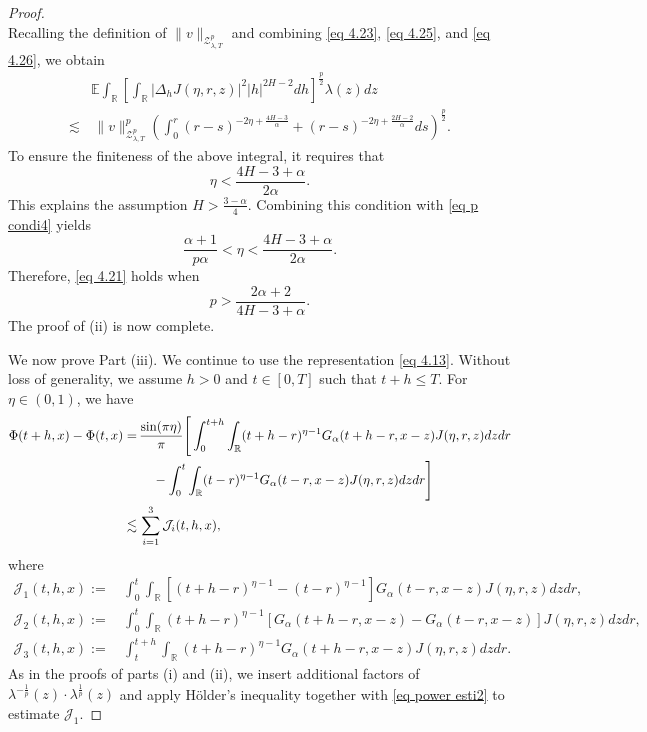 \documentclass[11pt,reqno]{amsart}
\numberwithin{equation}{section}
\newcommand{\1}{{\bf 1}}
\newcommand{\2}{{\bf 2}}
\begin{document}
\begin{proof}
\begin{equation}
\end{equation}
Recalling the definition of $\|v\|_{\mathcal{Z}_{\lambda,T}^p}$ and combining \eqref{eq 4.23}, \eqref{eq 4.25}, and \eqref{eq 4.26}, we obtain
\begin{equation}\label{eq 4.27}
\begin{split}
&\mathbb{E}\int_{\mathbb{R}} \left[\int_{\mathbb{R}}|\Delta_{h}J(\eta,r,z)|^2|h|^{2H-2}dh\right]^{\frac{p}2}\lambda(z)dz \\
 \lesssim &\,  \|v\|_{\mathcal{Z}_{\lambda,T}^p}^p\left( \int_0^r (r-s)^{-2\eta+\frac{4H-3}{\alpha}} +(r-s)^{-2\eta+\frac{2H-2}{\alpha}}ds\right)^{\frac{p}{2}}.
\end{split}
\end{equation}
To ensure the finiteness of the above integral,  it requires that 
 $$
 \eta<\frac{4H-3+\alpha}{2\alpha}.
 $$
  This explains   the assumption  $H> \frac{3-\alpha}{4}$. Combining this condition with \eqref{eq p condi4} yields
   $$
   \frac{\alpha+1}{p\alpha}<\eta<\frac{4H-3+\alpha}{2\alpha}.
   $$ 
  Therefore,   \eqref{eq 4.21} holds when 
  $$
  p>\frac{2\alpha+2}{4H-3+\alpha}.
  $$ 
  The proof of (ii) is now complete.

 
 We now  prove Part (iii). We continue to use the representation \eqref{eq 4.13}. Without loss of generality, we   assume $h>0$ and
$ t \in [0, T ]$ such that $t + h \le T $. For $\eta\in(0,1)$, we have
\begin{align*}
\Phi (t+h,x)-\Phi(t,x) 
 =&\, \frac{\sin(\pi \eta)}{\pi}\Bigg[\int_0^{t+h}\int_{\mathbb{R}}(t+h-r)^{\eta-1}G_{\alpha}(t+h-r,x-z)J(\eta,r,z)dzdr\\
&\hskip12pt -\int_0^{t}\int_{\mathbb{R}}(t-r)^{\eta-1}G_{\alpha}(t-r,x-z)J(\eta,r,z)dzdr\Bigg]\\
 \lesssim&\,  \sum_{i=1}^3\mathcal{J}_{i}(t,h,x),
\end{align*}
where
\begin{align*}
\mathcal{J}_1(t,h,x):=&\, \int_0^{t}\int_{\mathbb{R}}\left[(t+h-r)^{\eta-1}-(t-r)^{\eta-1}\right]G_{\alpha}(t-r,x-z)J(\eta,r,z)dzdr,   \\
\mathcal{J}_2(t,h,x):=&\, \int_0^{t}\int_{\mathbb{R}}(t+h-r)^{\eta-1}\left[G_{\alpha}(t+h-r,x-z)-G_{\alpha}(t-r,x-z)\right]J(\eta,r,z)dzdr,\\
  \mathcal{J}_3(t,h,x):= &\, \int_{t}^{t+h}\int_{\mathbb{R}}(t+h-r)^{\eta-1} G_{\alpha}(t+h-r,x-z) J(\eta,r,z)dzdr.
 \end{align*}
As in the proofs of parts (i) and (ii), we insert additional factors of $\lambda^{-\frac1p}(z)\cdot \lambda^{\frac1p}(z)$ and apply H\"older's inequality together with  \eqref{eq power esti2}  to estimate  $\mathcal{J}_1$.  


\end{proof}
\end{document}
